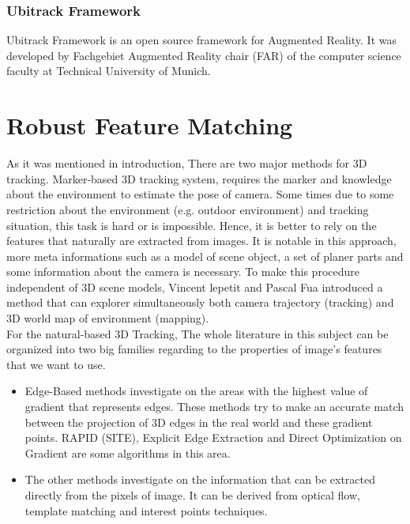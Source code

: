 \subsection{Ubitrack Framework}
Ubitrack Framework is an open source framework for Augmented Reality. It was developed by Fachgebiet Augmented Reality chair (FAR) of the computer science faculty at Technical University of Munich.

\chapter{Robust Feature Matching}\label{chapter:Robust Feature Matching}
As it was mentioned in introduction, There are two major methods for 3D tracking. Marker-based 3D tracking system, requires the marker and knowledge about the environment to estimate the pose of camera. Some times due to some restriction about the environment (e.g. outdoor environment) and tracking situation, this task is hard or is impossible. Hence, it is better to rely on the features that naturally are extracted from images. It is notable in this approach, more meta informations such as a model of scene object, a set of planer parts and some information about the camera is necessary. To make this procedure independent of 3D scene models, Vincent lepetit and Pascal Fua \cite{lepetit2005monocular} introduced a method that can explorer simultaneously both camera trajectory (tracking) and 3D world map of environment (mapping). \\
For the natural-based 3D Tracking, The whole literature in this subject can be organized into two big families regarding to the properties of image's features that we want to use.
\begin{itemize}
\item Edge-Based methods investigate on the areas with the highest value of gradient that represents edges. These methods try to make an accurate match between the projection of 3D edges in the real world and these gradient points. RAPID (SITE), Explicit Edge Extraction and Direct Optimization on Gradient are some algorithms in this area. 
\item The other methods investigate on the information that can be extracted directly from the pixels of image. It can be derived from optical flow, template matching and interest points techniques.
\end{itemize}

